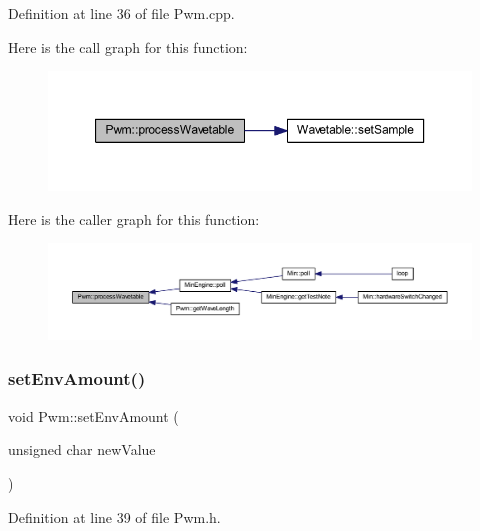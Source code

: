 Definition at line 36 of file Pwm.\+cpp.

Here is the call graph for this function\+:
\nopagebreak
\begin{figure}[H]
\begin{center}
\leavevmode
\includegraphics[width=350pt]{class_pwm_a51b2ea74a5b67115148141a843cddca1_cgraph}
\end{center}
\end{figure}
Here is the caller graph for this function\+:
\nopagebreak
\begin{figure}[H]
\begin{center}
\leavevmode
\includegraphics[width=350pt]{class_pwm_a51b2ea74a5b67115148141a843cddca1_icgraph}
\end{center}
\end{figure}
\mbox{\label{class_pwm_acda631e927e79a31dd2fc0e0116c88fc}} 
\subsubsection{\texorpdfstring{set\+Env\+Amount()}{setEnvAmount()}}
{\footnotesize\ttfamily void Pwm\+::set\+Env\+Amount (\begin{DoxyParamCaption}\item[{unsigned char}]{new\+Value }\end{DoxyParamCaption})\hspace{0.3cm}{\ttfamily [inline]}}



Definition at line 39 of file Pwm.\+h.

\mbox{\label{class_pwm_a1fe2ceb8636015244b4d3ed7ef15b333}} 
